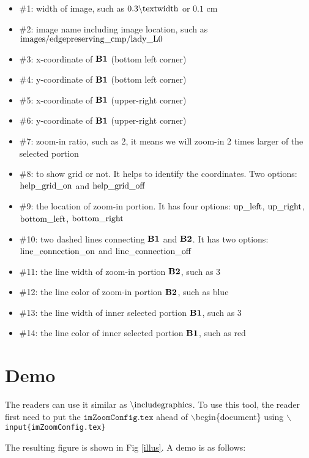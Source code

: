 \documentclass[11pt]{article}
\begin{document}
\begin{itemize}
	\item $\#$1: width of image, such as $0.3\backslash\rm{textwidth}$ or $0.1$ cm
	\item $\#$2: image name including image location, such as $\rm{images\slash edgepreserving\_cmp\slash lady\_L0}$
	\item $\#$3: x-coordinate of $\rm\bf{B}1$ (bottom left corner)
	\item $\#$4: y-coordinate of $\rm\bf{B}1$ (bottom left corner)
	\item $\#$5: x-coordinate of $\rm\bf{B}1$ (upper-right corner)
	\item $\#$6: y-coordinate of $\rm\bf{B}1$ (upper-right corner)
	\item $\#$7: zoom-in ratio, such as 2, it means we will zoom-in 2 times larger of the selected portion
	\item $\#$8: to show grid or not. It helps to identify the coordinates. Two options: $\rm{help}\_grid\_on$ and $\rm{help}\_grid\_off$ 
	\item $\#$9: the location of zoom-in portion. It has four options: $\rm{up\_left}$, $\rm{up\_right}$, $\rm{bottom\_left}$, $\rm{bottom\_right}$
	\item $\#$10: two dashed lines connecting $\rm\bf{B}1$ and $\rm\bf{B}2$. It has two options: $\rm{line\_connection\_on}$ and $\rm{line\_connection\_off}$
	\item $\#$11: the line width of zoom-in portion $\rm\bf{B}2$, such as 3
	\item $\#$12: the line color of zoom-in portion $\rm\bf{B}2$, such as blue
	\item $\#$13: the line width of inner selected portion $\rm\bf{B}1$, such as 3
	\item $\#$14: the line color of inner selected portion $\rm\bf{B}1$, such as red
\end{itemize}
 
 \section{Demo}
The readers can use it similar as $\backslash \rm{includegraphics}$. To use this tool, the reader first need to put the $\texttt{imZoomConfig.tex}$ ahead of $\backslash$begin\{document\} using \texttt{$\backslash$input\{imZoomConfig.tex\}}

The resulting figure is shown in Fig \ref{illus}. A demo is as follows:
\end{document}
